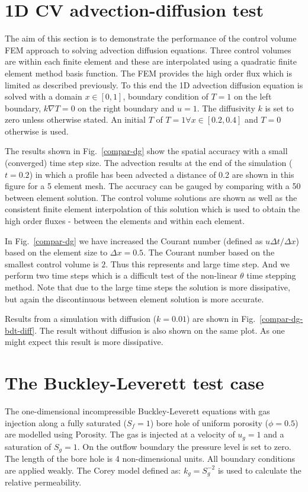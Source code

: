 \documentclass[preprint,authoryear,12pt]{elsarticle}
\begin{document}
{\section{1D CV advection-diffusion test}
The aim of this section is to demonstrate the performance of the
control volume FEM approach to solving advection diffusion equations.
Three control volumes are within each finite element and these are
interpolated using a quadratic finite element method basis
function. The FEM provides the high order flux which is limited as
described previously. To this end the 1D advection diffusion equation
is solved with a domain $x\in \left[0,1\right]$, boundary condition of
$T=1$ on the left boundary, $k \nabla T =0$ on the right boundary and
$u=1$. The diffusivity $k$ is set to zero unless otherwise stated. An
initial $T$ of $T=1 \forall x\in \left[ 0.2, 0.4 \right]$ and $T=0$
otherwise is used.

The results shown in Fig.~\ref{compar-dg} show the spatial accuracy
with a small (converged) time step size. The advection results at the
end of the simulation ($t=0.2$) in which a profile has been advected a
distance of 0.2 are shown in this figure for a 5 element mesh. The
accuracy can be gauged by comparing with a 50 between element
solution. The control volume solutions are shown as well as the
consistent finite element interpolation of this solution which is used
to obtain the high order fluxes - between the elements and within each
element. 

In Fig.~\ref{compar-dg} we have increased the Courant number
(defined as $u \Delta t / \Delta x$) based on the element size to
${\Delta x}=0.5$. The Courant number based on the smallest control
volume is $2$. Thus this represents and large time step. And we
perform two time steps which is a difficult test of the non-linear
$\theta$ time stepping method.  Note that due to the large time
steps the solution is more dissipative, but again the discontinuous
between element solution is more accurate.  

Results from a simulation with diffusion ($k=0.01$) are shown in
Fig.~\ref{compar-dg-bdt-diff}.  The result without diffusion is also
shown on the same plot.  As one might expect this result is more
dissipative.

\section{The Buckley-Leverett test case}
\label{res1}
The one-dimensional incompressible Buckley-Leverett equations with gas
injection along a fully saturated ($S_f=1$) bore hole of uniform
porosity ($\phi=0.5$) are modelled using Porosity. The gas is injected
at a velocity of $u_g=1$ and a saturation of $S_g=1$. On the outflow
boundary the pressure level is set to zero. The length of the bore
hole is 4 non-dimensional units. All boundary conditions are applied
weakly. The Corey model defined as: $k_g = S_g^{-2}$ is used to
calculate the relative permeability.

}
\end{document}

